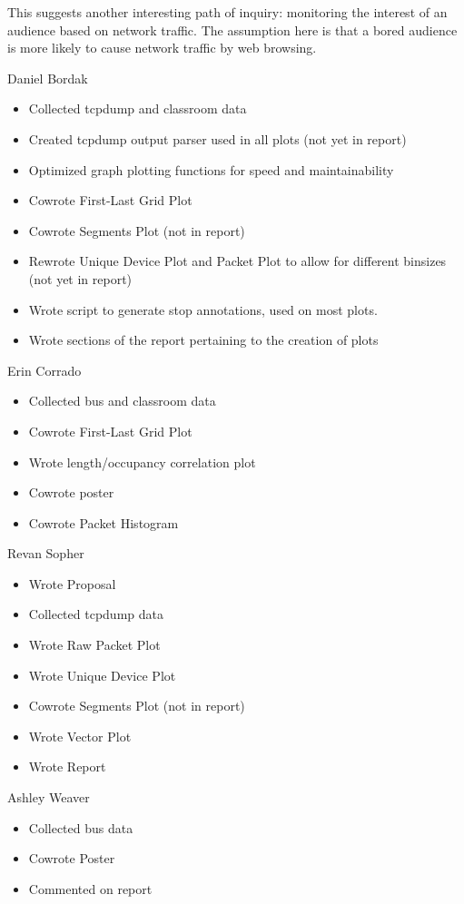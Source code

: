 \documentclass[11pt,journal,compsoc]{IEEEtran} %
\begin{document}
	This suggests another interesting path of inquiry: monitoring the interest of an audience based on network traffic.
	The assumption here is that a bored audience is more likely to cause network traffic by web browsing.

\pagebreak

Daniel Bordak
\begin{itemize}
  \item Collected tcpdump and classroom data
  \item Created tcpdump output parser used in all plots (not yet in report)
  \item Optimized graph plotting functions for speed and maintainability
  \item Cowrote First-Last Grid Plot
  \item Cowrote Segments Plot (not in report)
  \item Rewrote Unique Device Plot and Packet Plot to allow for different binsizes (not yet in report)
  \item Wrote script to generate stop annotations, used on most plots.
  \item Wrote sections of the report pertaining to the creation of plots
\end{itemize}
Erin Corrado
\begin{itemize}
  \item Collected bus and classroom data
  \item Cowrote First-Last Grid Plot
  \item Wrote length/occupancy correlation plot
  \item Cowrote poster
  \item Cowrote Packet Histogram
\end{itemize}
Revan Sopher
\begin{itemize}
  \item Wrote Proposal
  \item Collected tcpdump data
  \item Wrote Raw Packet Plot
  \item Wrote Unique Device Plot
  \item Cowrote Segments Plot (not in report)
  \item Wrote Vector Plot
  \item Wrote Report
\end{itemize}
Ashley Weaver
\begin{itemize}
  \item Collected bus data
  \item Cowrote Poster
  \item Commented on report
\end{itemize}
\end{document}
